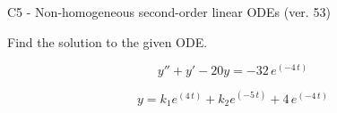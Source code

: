 \begin{exercise}
  \begin{exerciseTitle}C5 - Non-homogeneous second-order linear ODEs (ver. 53)\end{exerciseTitle}
  \begin{exerciseStatement}
    
Find the solution to the given ODE.

    
\[y''+y'-20y = -32 \, e^{\left(-4 \, t\right)}\]

  \end{exerciseStatement}
  \begin{exerciseAnswer}
    
\[y= k_{1} e^{\left(4 \, t\right)} + k_{2} e^{\left(-5 \, t\right)} + 4 \, e^{\left(-4 \, t\right)}\]

  \end{exerciseAnswer}
\end{exercise}